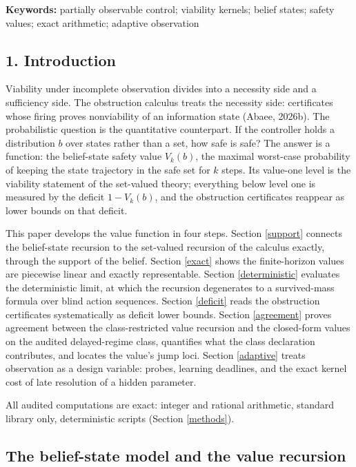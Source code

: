 \documentclass[10pt,twocolumn]{article}
\theoremstyle{plain}
\theoremstyle{definition}
\theoremstyle{remark}
\begin{document}
\textbf{Keywords:} partially observable control; viability kernels;
belief states; safety values; exact arithmetic; adaptive observation

\subsection{1. Introduction}\label{introduction}

Viability under incomplete observation divides into a necessity side and a
sufficiency side. The obstruction calculus treats the necessity side:
certificates whose firing proves nonviability of an information state
(Abaee, 2026b). The probabilistic question is the quantitative counterpart.
If the controller holds a distribution \(b\) over states rather than a set,
how safe is safe? The answer is a function: the belief-state safety value
\(V_{k}(b)\), the maximal worst-case probability of keeping the state
trajectory in the safe set for \(k\) steps. Its value-one level is the
viability statement of the set-valued theory; everything below level one
is measured by the deficit \(1 - V_{k}(b)\), and the obstruction
certificates reappear as lower bounds on that deficit.

This paper develops the value function in four steps. Section
\ref{support} connects the belief-state recursion to the set-valued
recursion of the calculus exactly, through the support of the belief.
Section \ref{exact} shows the finite-horizon values are piecewise linear
and exactly representable. Section \ref{deterministic} evaluates the
deterministic limit, at which the recursion degenerates to a
survived-mass formula over blind action sequences. Section
\ref{deficit} reads the obstruction certificates systematically as
deficit lower bounds. Section \ref{agreement} proves agreement between
the class-restricted value recursion and the closed-form values on the
audited delayed-regime class, quantifies what the class declaration
contributes, and locates the value's jump loci. Section
\ref{adaptive} treats observation as a design variable: probes,
learning deadlines, and the exact kernel cost of late resolution of a
hidden parameter.

All audited computations are exact: integer and rational arithmetic,
standard library only, deterministic scripts (Section \ref{methods}).

\subsection{The belief-state model and the value recursion}\label{model}
\end{document}
